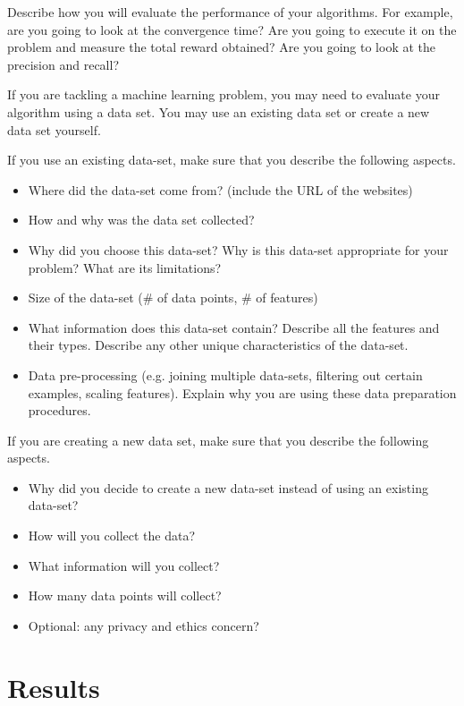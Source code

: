 \documentclass[letterpaper]{article} %
\begin{document}
Describe how you will evaluate the performance of your algorithms. For example, are you going to look at the convergence time? Are you going to execute it on the problem and measure the total reward obtained? Are you going to look at the precision and recall? 

\medskip
If you are tackling a machine learning problem, you may need to evaluate your algorithm using a data set. You may use an existing data set or create a new data set yourself. 

If you use an existing data-set, make sure that you describe the following aspects.
\begin{itemize}
    \item Where did the data-set come from? (include the URL of the websites)
    \item How and why was the data set collected? 
    \item Why did you choose this data-set? Why is this data-set appropriate for your problem? What are its limitations?
    \item Size of the data-set (\# of data points, \# of features)
    \item What information does this data-set contain? Describe all the features and their types. Describe any other unique characteristics of the data-set.
    \item Data pre-processing (e.g. joining multiple data-sets, filtering out certain examples, scaling features). Explain why you are using these data preparation procedures.
\end{itemize}

If you are creating a new data set, make sure that you describe the following aspects.
\begin{itemize}
\item Why did you decide to create a new data-set instead of using an existing data-set? 
\item How will you collect the data?
\item What information will you collect?  
\item How many data points will collect?
\item Optional: any privacy and ethics concern?
\end{itemize}



\section{Results}
\end{document}
